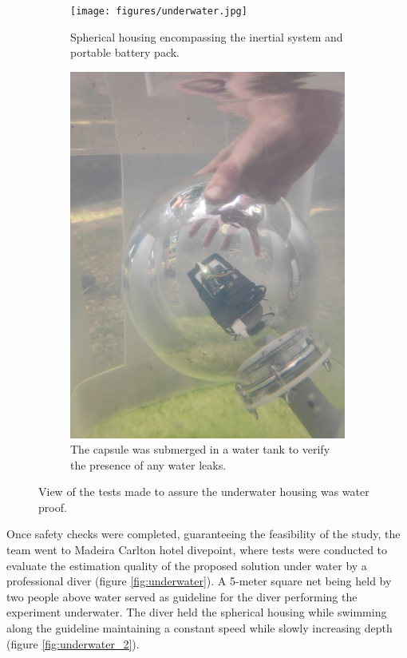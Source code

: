 \begin{figure}[!h]
  \centering
  \begin{subfigure}{0.45\textwidth}
    \centering
    \texttt{[image: figures/underwater.jpg]}
    \caption{ Spherical housing encompassing the inertial system and portable battery pack. }
    \label{fig:underwater1_test}
  \end{subfigure}
  \begin{subfigure}{0.45\textwidth}
    \centering
    \includegraphics[width=1\textwidth]{figures/underwater_1.jpg}
    \caption{ The capsule was submerged in a water tank to verify the presence of any water leaks. }
    \label{fig:underwater2_test}
  \end{subfigure}
  \label{fig:underwater_test}
  \caption{ View of the tests made to assure the underwater housing was water proof. }
\end{figure}

Once safety checks were completed, guaranteeing the feasibility of the study, the team went to Madeira Carlton hotel divepoint, where tests were conducted to evaluate the estimation quality of the proposed solution under water by a professional diver (figure \ref{fig:underwater}). A 5-meter square net being held by two people above water served as guideline for the diver performing the experiment underwater. The diver held the spherical housing while swimming along the guideline maintaining a constant speed while slowly increasing depth (figure \ref{fig:underwater_2}).

